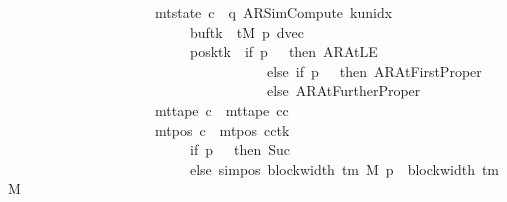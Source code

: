 \begin{isabellebody}
\ \ \ \ \ \ \ \ \ \ \ \ \ \ \ \ \ \ \ \ {\isasymand}\ mt{\isacharunderscore}{\kern0pt}state\ c{\isacharprime}{\kern0pt}{\isacharprime}{\kern0pt}\ {\isacharequal}{\kern0pt}\ {\isacharparenleft}{\kern0pt}q{\isacharcomma}{\kern0pt}\ AR{\isacharunderscore}{\kern0pt}SimCompute{\isacharcomma}{\kern0pt}\ k{\isacharunderscore}{\kern0pt}unidx\ {}{\isacharcomma}{\kern0pt}\ {}{\isacharcomma}{\kern0pt}\isanewline
\ \ \ \ \ \ \ \ \ \ \ \ \ \ \ \ \ \ \ \ \ \ \ \ \ \ buf{\isacharprime}{\kern0pt}{\isacharparenleft}{\kern0pt}tk{\isacharprime}{\kern0pt}\ {\isacharcolon}{\kern0pt}{\isacharequal}{\kern0pt}\ tM{\isacharprime}{\kern0pt}\ p{\isacharprime}{\kern0pt}{\isacharparenright}{\kern0pt}{\isacharcomma}{\kern0pt}\ dvec{\isacharcomma}{\kern0pt}\isanewline
\ \ \ \ \ \ \ \ \ \ \ \ \ \ \ \ \ \ \ \ \ \ \ \ \ \ posk{\isacharprime}{\kern0pt}{\isacharparenleft}{\kern0pt}tk{\isacharprime}{\kern0pt}\ {\isacharcolon}{\kern0pt}{\isacharequal}{\kern0pt}\ if\ p{\isacharprime}{\kern0pt}\ {\isacharequal}{\kern0pt}\ {}\ then\ AR{\isacharunderscore}{\kern0pt}AtLE\isanewline
\ \ \ \ \ \ \ \ \ \ \ \ \ \ \ \ \ \ \ \ \ \ \ \ \ \ \ \ \ \ \ \ \ \ \ \ \ else\ if\ p{\isacharprime}{\kern0pt}\ {\isacharequal}{\kern0pt}\ {}\ then\ AR{\isacharunderscore}{\kern0pt}AtFirstProper\isanewline
\ \ \ \ \ \ \ \ \ \ \ \ \ \ \ \ \ \ \ \ \ \ \ \ \ \ \ \ \ \ \ \ \ \ \ \ \ else\ AR{\isacharunderscore}{\kern0pt}AtFurtherProper{\isacharparenright}{\kern0pt}{\isacharparenright}{\kern0pt}\isanewline
\ \ \ \ \ \ \ \ \ \ \ \ \ \ \ \ \ \ \ \ {\isasymand}\ mt{\isacharunderscore}{\kern0pt}tape\ c{\isacharprime}{\kern0pt}{\isacharprime}{\kern0pt}\ {\isacharequal}{\kern0pt}\ mt{\isacharunderscore}{\kern0pt}tape\ cc\isanewline
\ \ \ \ \ \ \ \ \ \ \ \ \ \ \ \ \ \ \ \ {\isasymand}\ mt{\isacharunderscore}{\kern0pt}pos\ c{\isacharprime}{\kern0pt}{\isacharprime}{\kern0pt}\ {\isacharequal}{\kern0pt}\ {\isacharparenleft}{\kern0pt}mt{\isacharunderscore}{\kern0pt}pos\ cc{\isacharparenright}{\kern0pt}{\isacharparenleft}{\kern0pt}tk{\isacharprime}{\kern0pt}\ {\isacharcolon}{\kern0pt}{\isacharequal}{\kern0pt}\isanewline
\ \ \ \ \ \ \ \ \ \ \ \ \ \ \ \ \ \ \ \ \ \ \ \ \ \ if\ p{\isacharprime}{\kern0pt}\ {\isacharequal}{\kern0pt}\ {}\ then\ Suc\ {}\isanewline
\ \ \ \ \ \ \ \ \ \ \ \ \ \ \ \ \ \ \ \ \ \ \ \ \ \ else\ sim{\isacharunderscore}{\kern0pt}pos\ {\isacharparenleft}{\kern0pt}block{\isacharunderscore}{\kern0pt}width\ {\isacharparenleft}{\kern0pt}{\isasymGamma}{\isacharunderscore}{\kern0pt}tm\ M{\isacharparenright}{\kern0pt}{\isacharparenright}{\kern0pt}\ p{\isacharprime}{\kern0pt}\ {\isacharplus}{\kern0pt}\ block{\isacharunderscore}{\kern0pt}width\ {\isacharparenleft}{\kern0pt}{\isasymGamma}{\isacharunderscore}{\kern0pt}tm\ M{\isacharparenright}{\kern0pt}{\isacharparenright}{\kern0pt}{\isachardoublequoteclose}\isanewline

\end{isabellebody}

